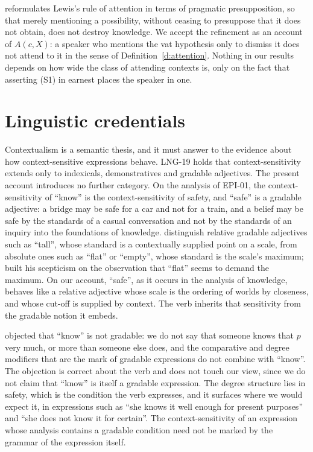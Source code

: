 \documentclass{situationist-preprint}
\begin{document}
\citet{BlomeTillmann2009} reformulates Lewis's rule of attention in terms of pragmatic presupposition, so that merely mentioning a possibility, without ceasing to presuppose that it does not obtain, does not destroy knowledge. We accept the refinement as an account of $A(c,X)$: a speaker who mentions the vat hypothesis only to dismiss it does not attend to it in the sense of Definition~\ref{d:attention}. Nothing in our results depends on how wide the class of attending contexts is, only on the fact that asserting (S1) in earnest places the speaker in one.

\section{Linguistic credentials}

Contextualism is a semantic thesis, and it must answer to the evidence about how context-sensitive expressions behave. LNG-19 holds that context-sensitivity extends only to indexicals, demonstratives and gradable adjectives. The present account introduces no further category. On the analysis of EPI-01, the context-sensitivity of \enquote{know} is the context-sensitivity of safety, and \enquote{safe} is a gradable adjective: a bridge may be safe for a car and not for a train, and a belief may be safe by the standards of a casual conversation and not by the standards of an inquiry into the foundations of knowledge. \citet{KennedyMcNally2005} distinguish relative gradable adjectives such as \enquote{tall}, whose standard is a contextually supplied point on a scale, from absolute ones such as \enquote{flat} or \enquote{empty}, whose standard is the scale's maximum; \citet{Unger1975} built his scepticism on the observation that \enquote{flat} seems to demand the maximum. On our account, \enquote{safe}, as it occurs in the analysis of knowledge, behaves like a relative adjective whose scale is the ordering of worlds by closeness, and whose cut-off is supplied by context. The verb inherits that sensitivity from the gradable notion it embeds.

\citet{Stanley2004} objected that \enquote{know} is not gradable: we do not say that someone knows that $p$ very much, or more than someone else does, and the comparative and degree modifiers that are the mark of gradable expressions do not combine with \enquote{know}. The objection is correct about the verb and does not touch our view, since we do not claim that \enquote{know} is itself a gradable expression. The degree structure lies in safety, which is the condition the verb expresses, and it surfaces where we would expect it, in expressions such as \enquote{she knows it well enough for present purposes} and \enquote{she does not know it for certain}. The context-sensitivity of an expression whose analysis contains a gradable condition need not be marked by the grammar of the expression itself.
\end{document}
